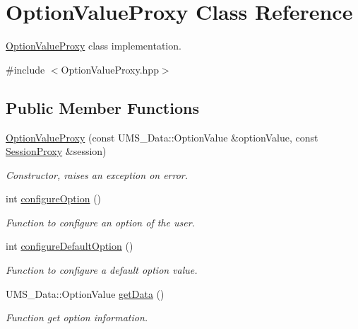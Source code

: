 \hypertarget{classOptionValueProxy}{
\section{OptionValueProxy Class Reference}
\label{classOptionValueProxy}
}


\hyperlink{classOptionValueProxy}{OptionValueProxy} class implementation.  




{\ttfamily \#include $<$OptionValueProxy.hpp$>$}

\subsection*{Public Member Functions}
\begin{DoxyCompactItemize}
\item 
\hyperlink{classOptionValueProxy_ac25bdab851001abdd2d24466493d4649}{OptionValueProxy} (const UMS\_\-Data::OptionValue \&optionValue, const \hyperlink{classSessionProxy}{SessionProxy} \&session)
\begin{DoxyCompactList}\small\item\em Constructor, raises an exception on error. \item\end{DoxyCompactList}\item 
int \hyperlink{classOptionValueProxy_ae6db8f1eb397361e86a37c45afca234f}{configureOption} ()
\begin{DoxyCompactList}\small\item\em Function to configure an option of the user. \item\end{DoxyCompactList}\item 
int \hyperlink{classOptionValueProxy_a2d4ef21b234a046918844158a5c9197f}{configureDefaultOption} ()
\begin{DoxyCompactList}\small\item\em Function to configure a default option value. \item\end{DoxyCompactList}\item 
UMS\_\-Data::OptionValue \hyperlink{classOptionValueProxy_ada8f1f1c9ec69655b9dc7a7e0d128629}{getData} ()
\begin{DoxyCompactList}\small\item\em Function get option information. \item\end{DoxyCompactList}\item 

\end{DoxyCompactItemize}
